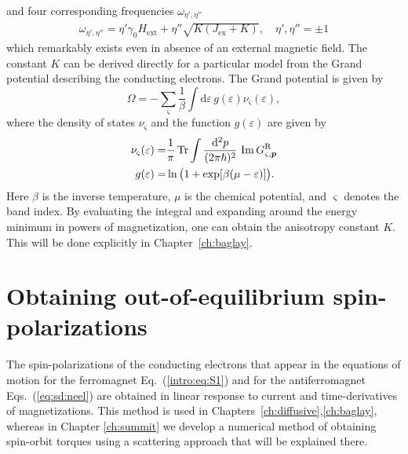 and four corresponding frequencies $\omega_{\eta',\eta''}$  
\begin{align}
    \omega_{\eta',\eta''} = \eta' \gamma_0 H_\text{ext} +\eta'' \sqrt{K(J_\text{ex}+K)}, \quad \eta',\eta''=\pm1
\end{align}
which remarkably exists even in absence of an external magnetic field. The constant $K$ can be derived directly for a particular model from the Grand potential describing the conducting electrons. The Grand potential is given by
\begin{equation}
    \Omega = - \sum_{\varsigma}\frac{1}{\beta} \int \mathrm{d}\varepsilon\,g(\varepsilon) \nu_\varsigma(\varepsilon),
    \label{b1}
\end{equation}
where the density of states $\nu_\varsigma$ and the function $g(\varepsilon)$ are given by
\begin{align}
    \nu_\varsigma(\varepsilon) =  &  \frac{1}{\pi} \operatorname{Tr} \int \frac{\mathrm{d}^2p}{(2\pi\hslash)^2}\,\operatorname{Im} G^\text{R}_{\varsigma,\boldsymbol{p}}\\
    g(\varepsilon) =  &  \mathop{\mathrm{ln}}\nolimits \big(1+\exp[\beta(\mu-\varepsilon)]\big).
    \label{eq:nu}
\end{align}
Here $\beta$ is the inverse temperature, $\mu$ is the chemical potential, and $\varsigma$ denotes the band index. By evaluating the integral and expanding around the energy minimum in powers of magnetization, one can obtain the anisotropy constant $K$. This will be done explicitly in Chapter~\ref{ch:baglay}.

\section{Obtaining out-of-equilibrium spin-polarizations}\label{diagrammatics}
The spin-polarizations of the conducting electrons that appear in the equations of motion for the ferromagnet Eq.~(\ref{intro:eq:S1}) and for the antiferromagnet Eqs.~(\ref{eq:sd:neel}) are obtained in linear response to current and time-derivatives of magnetizations. This method is used in Chapters~\ref{ch:diffusive},\ref{ch:baglay}, whereas in Chapter \ref{ch:summit} we develop a numerical method of obtaining spin-orbit torques using a scattering approach that will be explained there. 

